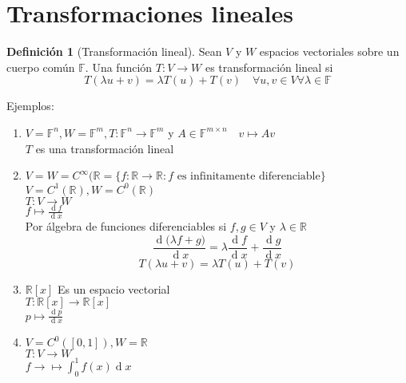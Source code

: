 \documentclass[11pt]{book}
\renewcommand{\d}[1]{\ensuremath{\operatorname{d}\!{#1}}}
\theoremstyle{definition}
\newtheorem{defn}{Definición}[section]
\begin{document}
\section{Transformaciones lineales}
\begin{defn}[Transformación lineal]
	Sean $V$ y $W$ espacios vectoriales sobre un cuerpo común $\mathbb{F}$.
	Una función $T:V\rightarrow W$ es transformación lineal si
	\[T(\lambda u+v)=\lambda T(u)+T(v)\quad \forall u,v\in V \forall\lambda\in\mathbb{F}
	\]
\end{defn}
Ejemplos:
\begin{enumerate}
	\item $V=\mathbb{F}^n, W=\mathbb{F}^m, T:\mathbb{F}^n\rightarrow\mathbb{F}^m$ y $A\in\mathbb{F}^{m\times n}\quad v\mapsto Av$\\
	      $T$ es una transformación lineal

	\item $V=W=C^\infty(\mathbb{R}=\{f:\mathbb{R}\rightarrow\mathbb{R}: f\textrm{ es infinitamente diferenciable}\}$\\
	      $V=C^1(\mathbb{R}), W=C^0(\mathbb{R})$\\
	      $T:V\rightarrow W$\\
	      $f\mapsto\frac{\d f}{\d x}$\\
	      Por álgebra de funciones diferenciables si $f,g\in V$ y $\lambda\in\mathbb{R}$
	      \[
		      \frac{\d (\lambda f+g)}{\d x}=\lambda\frac{\d f}{\d x}+\frac{\d g}{\d x}
	      \]
	      \[
		      T(\lambda u+v)=\lambda T(u)+T(v)
	      \]

	\item $\mathbb{R}[x]$ Es un espacio vectorial\\
	      $T:\mathbb{R}[x]\rightarrow \mathbb{R}[x]$\\
	      $p\mapsto\frac{\d p}{\d x}$

	\item $V=C^0([0,1]), W=\mathbb{R}$\\
	      $T:V\rightarrow W$\\
	      $f\rightarrow\mapsto\int^1_0f(x)\d x$
\end{enumerate}
\end{document}
